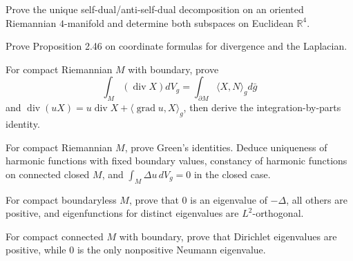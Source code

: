\begin{exercise}\label{prob:self-dual-anti-self-dual}
\leanok
{}
Prove the unique self-dual/anti-self-dual decomposition on an oriented Riemannian $4$-manifold and determine both subspaces on Euclidean $\mathbb R^4$.
\end{exercise}

\begin{exercise}\label{prob:divergence-laplacian-formulas-ch2}
Prove Proposition 2.46 on coordinate formulas for divergence and the Laplacian.
\end{exercise}

\begin{exercise}\label{prob:divergence-theorem}
For compact Riemannian $M$ with boundary, prove
\[
\int_M(\operatorname{div}X)dV_g=\int_{\partial M}\langle X,N\rangle_gd\bar g
\]
and $\operatorname{div}(uX)=u\operatorname{div}X+\langle\operatorname{grad}u,X\rangle_g$, then derive the integration-by-parts identity.
\end{exercise}

\begin{exercise}\label{prob:harmonic-functions}
For compact Riemannian $M$, prove Green's identities. Deduce uniqueness of harmonic functions with fixed boundary values, constancy of harmonic functions on connected closed $M$, and $\int_M\Delta u\,dV_g=0$ in the closed case.
\end{exercise}

\begin{exercise}\label{prob:eigenvalues}
For compact boundaryless $M$, prove that $0$ is an eigenvalue of $-\Delta$, all others are positive, and eigenfunctions for distinct eigenvalues are $L^2$-orthogonal.
\end{exercise}

\begin{exercise}\label{prob:dirichlet-neumann-eigenvalues}
For compact connected $M$ with boundary, prove that Dirichlet eigenvalues are positive, while $0$ is the only nonpositive Neumann eigenvalue.
\end{exercise}

